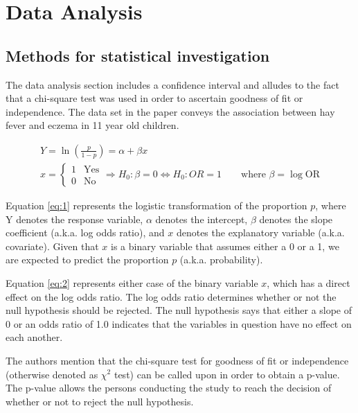 \documentclass{article}
\begin{document}
\section{Data Analysis}
	\subsection{Methods for statistical investigation}
	
The data analysis section includes a confidence interval and alludes to the fact that a chi-square test was used in order to ascertain goodness of fit or independence. The data set in the paper conveys the association between hay fever and eczema in 11 year old children.\cite{BMJ:1}

\begin{gather}\label{eq:1}
Y=\ln{\left({\frac {p}{1-p}}\right)}=\alpha+\beta x\\[1 pc]
\label{eq:2}
x=\begin{cases} 1 & \text{Yes} \\ 0 & \text{No} \end{cases} \Rightarrow H_0 : \beta = 0 \Leftrightarrow H_0 : OR = 1 \qquad \text{where $\beta = \log{\text{OR}}$}
\end{gather}

\vspace{1 pc}
 
Equation \ref{eq:1} represents the logistic transformation of the proportion $p$, where Y denotes the response variable, $\alpha$ denotes the intercept, $\beta$ denotes the slope coefficient (a.k.a. log odds ratio), and $x$ denotes the explanatory variable (a.k.a. covariate). Given that $x$ is a binary variable that assumes either a 0 or a 1, we are expected to predict the proportion $p$ (a.k.a. probability).

\pagebreak

Equation \ref{eq:2} represents either case of the binary variable $x$, which has a direct effect on the log odds ratio. The log odds ratio determines whether or not the null hypothesis should be rejected. The null hypothesis says that either a slope of 0 or an odds ratio of 1.0 indicates that the variables in question have no effect on each another.

\vspace{1 pc}

The authors mention that the chi-square test for goodness of fit or independence (otherwise denoted as $\chi^{2}$ test) can be called upon in order to obtain a p-value. The p-value allows the persons conducting the study to reach the decision of whether or not to reject the null hypothesis.
\end{document}
